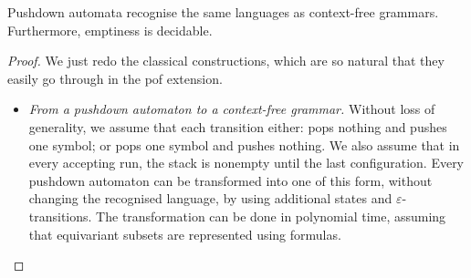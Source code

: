 	



\begin{theorem}\label{thm:pof-equality-pushdown}
	Pushdown automata recognise the same languages as context-free grammars. 
	Furthermore, emptiness is decidable.
\end{theorem}
\begin{proof}
We just redo the classical constructions, which are so natural  that they easily go through in the pof extension. 
	\begin{itemize}
		\item \emph{From a pushdown automaton to a context-free grammar.} Without loss of generality, we assume that each transition either: pops nothing and pushes one symbol; or pops one symbol and pushes nothing.  We also assume that in every accepting run, the stack is nonempty until the last configuration.  Every pushdown automaton can be transformed into one of this form, without changing the recognised language, by using additional states and $\varepsilon$-transitions. The transformation can be done in polynomial time, assuming that equivariant subsets are represented using formulas.
		

\end{itemize}
\end{proof}
